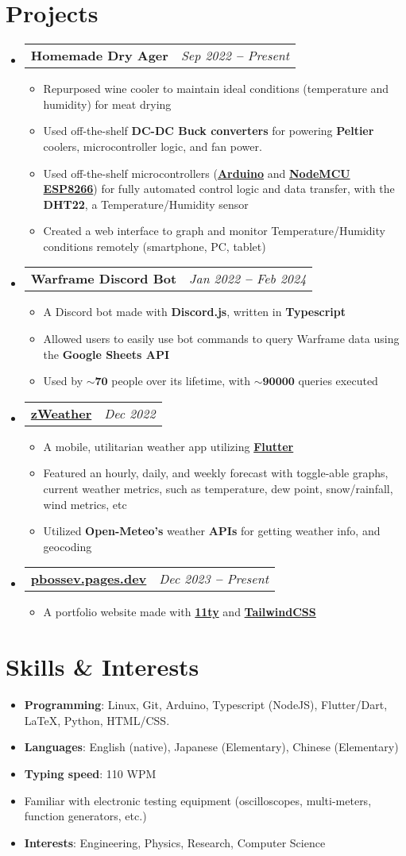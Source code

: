 \documentclass[letterpaper,9pt]{article}
\makeatletter
\newcommand{\cvSubItem}[1]{
  \item\small{
    {#1 \vspace{-2pt}}
  }
}
\newcommand{\cvTwo}[2]{
  \vspace{-2pt}\item
    \begin{tabular*}{1\textwidth}[t]{l@{\extracolsep{\fill}}r}
      \textbf{#1} & \textit{\small #2} \\
    \end{tabular*}\vspace{-5pt}
}
\newcommand{\cvItem}[1]{
  \item{
    #1
  }
  \vspace{-5pt}
}
\newcommand{\cvBodyStart}{\begin{itemize}[leftmargin=0.15in, label={}]}
\newcommand{\cvBodyEnd}{\end{itemize}}
\newcommand{\cvListStart}{\begin{itemize}}
\newcommand{\cvListEnd}{\end{itemize}\vspace{-5pt}}
\newcommand{\cvRegListStart}{\begin{itemize}[leftmargin=0.22in, label={}]}
\newcommand{\cvRegListEnd}{\end{itemize}}
\makeatother
\begin{document}
\section{Projects}
\cvBodyStart
    \cvTwo{Homemade Dry Ager}{Sep 2022 \textbf{--} Present}
    \cvListStart
        \cvSubItem{Repurposed wine cooler to maintain ideal conditions (temperature and humidity) for meat drying}
        \cvSubItem{Used off-the-shelf \textbf{DC-DC Buck converters} for powering \textbf{Peltier} coolers, microcontroller logic, and fan power.}
        \cvSubItem{Used off-the-shelf microcontrollers (\textbf{\href{https://www.arduino.cc/}{Arduino}} and \textbf{\href{https://en.wikipedia.org/wiki/NodeMCU}{NodeMCU ESP8266}}) for fully automated control logic and data transfer, with the \textbf{DHT22}, a Temperature/Humidity sensor}
        \cvSubItem{Created a web interface to graph and monitor Temperature/Humidity conditions remotely (smartphone, PC, tablet)}
    \cvListEnd
    \cvTwo{Warframe Discord Bot}{Jan 2022 \textbf{--} Feb 2024}
    \cvListStart
        \cvSubItem{A Discord bot made with \textbf{Discord.js}, written in \textbf{Typescript}}
        \cvSubItem{Allowed users to easily use bot commands to query Warframe data using the \textbf{Google Sheets API}}
        \cvSubItem{Used by $\mathbf{\sim70}$ people over its lifetime, with $\mathbf{\sim90000}$ queries executed}
    \cvListEnd
    \cvTwo{\href{https://pbossev.pages.dev/projects/zweather/}{zWeather}}{Dec 2022}
    \cvListStart
        \cvSubItem{A mobile, utilitarian weather app utilizing \textbf{\href{https://flutter.dev/}{Flutter}}}
        \cvSubItem{Featured an hourly, daily, and weekly forecast with toggle-able graphs, current weather metrics, such as temperature, dew point, snow/rainfall, wind metrics, etc}
        \cvSubItem{Utilized \textbf{Open-Meteo's} weather \textbf{APIs} for getting weather info, and geocoding}
    \cvListEnd
    \cvTwo{\href{https://pbossev.pages.dev/}{pbossev.pages.dev}}{Dec 2023 \textbf{--} Present}
    \cvListStart
        \cvSubItem{A portfolio website made with \textbf{\href{https://www.11ty.dev/}{11ty}} and \textbf{\href{https://tailwindcss.com/}{TailwindCSS}}}
    \cvListEnd
\cvBodyEnd

\section{Skills \& Interests}
\cvRegListStart
    \cvItem{\textbf{Programming}: Linux, Git, Arduino, Typescript (NodeJS), Flutter/Dart, LaTeX, Python, HTML/CSS. }
    \cvItem{\textbf{Languages}: English (native), Japanese (Elementary), Chinese (Elementary)}
    \cvItem{\textbf{Typing speed}: 110 WPM}
    \cvItem{Familiar with electronic testing equipment (oscilloscopes, multi-meters, function generators, etc.)}
    \cvItem{\textbf{Interests}: Engineering, Physics, Research, Computer Science}
\cvRegListEnd
\end{document}
